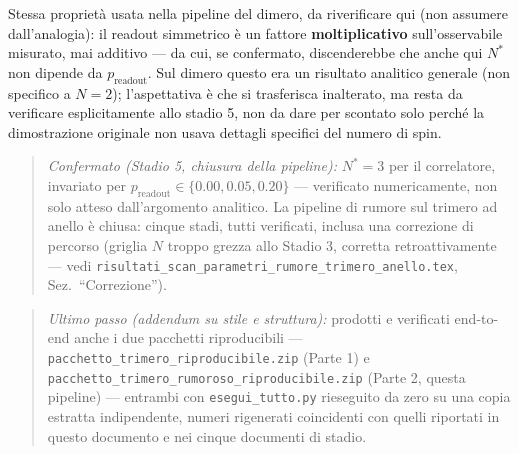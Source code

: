 \documentclass[11pt,a4paper]{article}
\begin{document}
Stessa proprietà usata nella pipeline del dimero, da riverificare qui
(non assumere dall'analogia): il readout simmetrico è un fattore
\textbf{moltiplicativo} sull'osservabile misurato, mai additivo --- da
cui, se confermato, discenderebbe che anche qui $N^*$ non dipende da
$p_\text{readout}$. Sul dimero questo era un risultato analitico
generale (non specifico a $N=2$); l'aspettativa è che si trasferisca
inalterato, ma resta da verificare esplicitamente allo stadio 5, non da
dare per scontato solo perché la dimostrazione originale non usava
dettagli specifici del numero di spin.

\begin{quote}
\textit{Confermato (Stadio 5, chiusura della pipeline):} $N^*=3$ per il
correlatore, invariato per $p_\text{readout}\in\{0.00, 0.05, 0.20\}$
--- verificato numericamente, non solo atteso dall'argomento analitico.
La pipeline di rumore sul trimero ad anello è chiusa: cinque stadi,
tutti verificati, inclusa una correzione di percorso (griglia $N$ troppo
grezza allo Stadio 3, corretta retroattivamente --- vedi
\texttt{risultati\_\allowbreak scan\_\allowbreak parametri\_rumore\_trimero\_anello.tex},
Sez.\ ``Correzione'').
\end{quote}

\begin{quote}
\textit{Ultimo passo (addendum su stile e struttura):} prodotti e
verificati end-to-end anche i due pacchetti riproducibili ---
\texttt{pacchetto\_trimero\_\allowbreak riproducibile.zip} (Parte 1) e
\texttt{pacchetto\_trimero\_\allowbreak rumoroso\_\allowbreak riproducibile.zip}
(Parte 2, questa pipeline) --- entrambi con \texttt{esegui\_tutto.py}
rieseguito da zero su una copia estratta indipendente, numeri
rigenerati coincidenti con quelli riportati in questo documento e nei
cinque documenti di stadio.
\end{quote}
\end{document}
